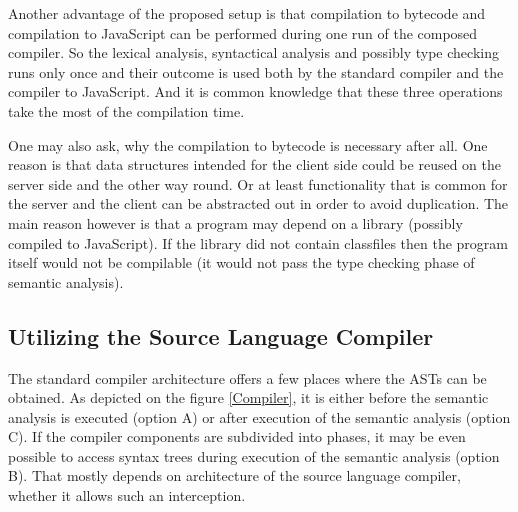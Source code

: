 \documentclass[12pt,a4paper]{report}
\begin{document}
Another advantage of the proposed setup is that compilation to bytecode and compilation to JavaScript can be performed during one run of the composed compiler. So the lexical analysis, syntactical analysis and possibly type checking runs only once and their outcome is used both by the standard compiler and the compiler to JavaScript. And it is common knowledge that these three operations take the most of the compilation time. 

One may also ask, why the compilation to bytecode is necessary after all. One reason is that data structures intended for the client side could be reused on the server side and the other way round. Or at least functionality that is common for the server and the client can be abstracted out in order to avoid duplication. The main reason however is that a program may depend on a library (possibly compiled to JavaScript). If the library did not contain classfiles then the program itself would not be compilable (it would not pass the type checking phase of semantic analysis).

\subsection{Utilizing the Source Language Compiler}

The standard compiler architecture offers a few places where the ASTs can be obtained. As depicted on the figure \ref{Compiler}, it is either before the semantic analysis is executed (option A) or after execution of the semantic analysis (option C). If the compiler components are subdivided into phases, it may be even possible to access syntax trees during execution of the semantic analysis (option B). That mostly depends on architecture of the source language compiler, whether it allows such an interception.
\end{document}
